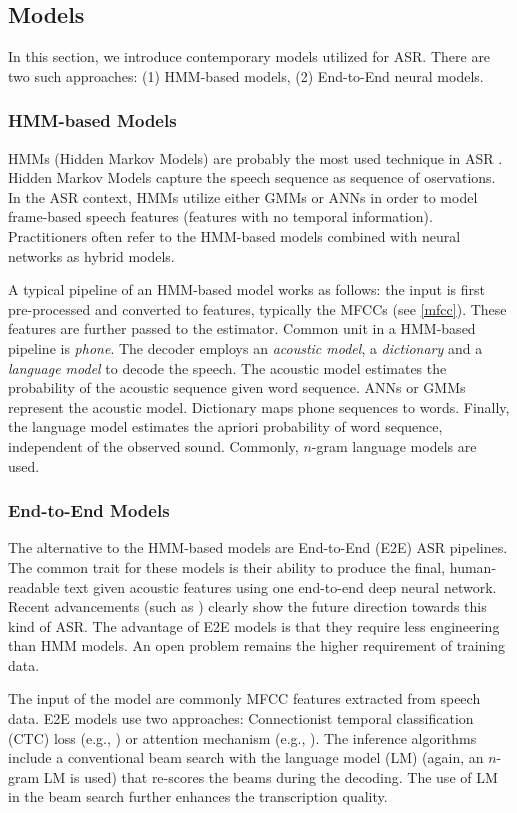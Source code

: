 \subsection{Models}
In this section, we introduce contemporary models utilized for ASR. There are two such approaches: (1) HMM-based models, (2) End-to-End neural models.

\subsubsection{HMM-based Models}
HMMs (Hidden Markov Models) are probably the most used technique in ASR . Hidden Markov Models capture the speech sequence as sequence of oservations. In the ASR context, HMMs utilize either GMMs or ANNs in order to model frame-based speech features (features with no temporal information). Practitioners often refer to the HMM-based models combined with neural networks as hybrid models.

A typical pipeline of an HMM-based model works as follows: the input is first pre-processed and converted to features, typically the MFCCs (see \cref{mfcc}). These features are further passed to the estimator. Common unit in a HMM-based pipeline is \emph{phone}. The decoder employs an \emph{acoustic model}, a \emph{dictionary} and a \emph{language model} to decode the speech. The acoustic model estimates the probability of the acoustic sequence given word sequence. ANNs or GMMs represent the acoustic model. Dictionary maps phone sequences to words. Finally, the language model estimates the apriori probability of word sequence, independent of the observed sound. Commonly, $n$-gram language models are used. 

\subsubsection{End-to-End Models}
The alternative to the HMM-based models are End-to-End (E2E) ASR pipelines. The common trait for these models is their ability to produce the final, human-readable text given acoustic features using one end-to-end deep neural network. Recent advancements (such as ) clearly show the future direction towards this kind of ASR. The advantage of E2E models is that they require less engineering than HMM models. An open problem remains the higher requirement of training data.

The input of the model are commonly MFCC features extracted from speech data. E2E models use two approaches: Connectionist temporal classification (CTC)  loss (e.g., ) or attention mechanism (e.g., ). The inference algorithms include a conventional beam search with the language model (LM) (again, an $n$-gram LM is used) that re-scores the beams during the decoding. The use of LM in the beam search further enhances the transcription quality.







